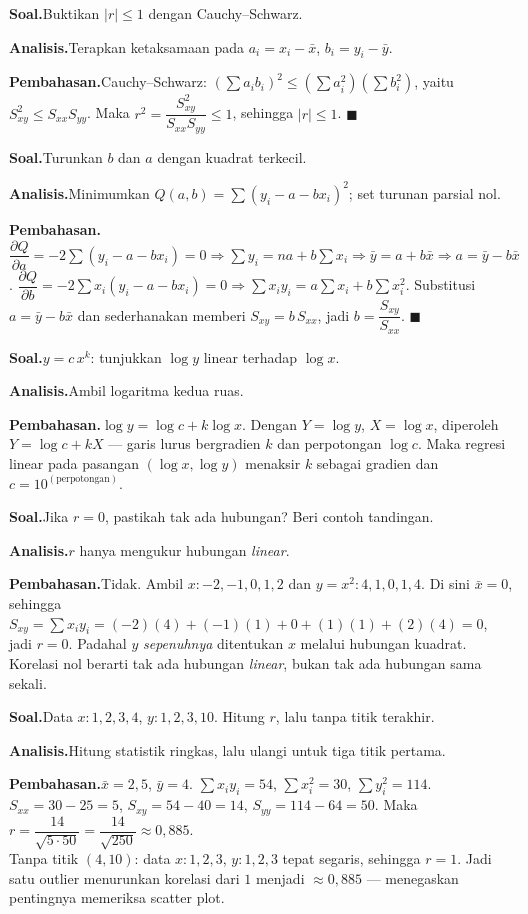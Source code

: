 \documentclass[11pt,a4paper]{report}
\theoremstyle{gaya}
\newcommand{\knomor}[1]{\par\medskip\noindent{\bfseries\color{ungu}#1}\par\nopagebreak}
\newcommand{\ksoal}{\noindent\textbf{\color{biru}Soal.}\space}
\newcommand{\kanalisis}{\par\noindent\textbf{\color{oranye}Analisis.}\space}
\newcommand{\kbahas}{\par\noindent\textbf{\color{hijau}Pembahasan.}\space}
\newcommand{\kbagian}[1]{\par\medskip\noindent{\large\bfseries\color{biru}#1}\par\smallskip}
\begin{document}
\knomor{D.2}
\ksoal Buktikan $|r|\le1$ dengan Cauchy--Schwarz.
\kanalisis Terapkan ketaksamaan pada $a_i=x_i-\bar x$, $b_i=y_i-\bar y$.
\kbahas Cauchy--Schwarz: $\left(\sum a_ib_i\right)^2\le\left(\sum a_i^2\right)\left(\sum b_i^2\right)$, yaitu $S_{xy}^2\le S_{xx}S_{yy}$. Maka $r^2=\dfrac{S_{xy}^2}{S_{xx}S_{yy}}\le1$, sehingga $|r|\le1$. $\blacksquare$

\knomor{D.3}
\ksoal Turunkan $b$ dan $a$ dengan kuadrat terkecil.
\kanalisis Minimumkan $Q(a,b)=\sum(y_i-a-bx_i)^2$; set turunan parsial nol.
\kbahas $\dfrac{\partial Q}{\partial a}=-2\sum(y_i-a-bx_i)=0\Rightarrow \sum y_i=na+b\sum x_i\Rightarrow \bar y=a+b\bar x\Rightarrow a=\bar y-b\bar x$.
$\dfrac{\partial Q}{\partial b}=-2\sum x_i(y_i-a-bx_i)=0\Rightarrow \sum x_iy_i=a\sum x_i+b\sum x_i^2$. Substitusi $a=\bar y-b\bar x$ dan sederhanakan memberi $S_{xy}=b\,S_{xx}$, jadi $b=\dfrac{S_{xy}}{S_{xx}}$. $\blacksquare$

\knomor{D.4}
\ksoal $y=c\,x^k$: tunjukkan $\log y$ linear terhadap $\log x$.
\kanalisis Ambil logaritma kedua ruas.
\kbahas $\log y=\log c+k\log x$. Dengan $Y=\log y$, $X=\log x$, diperoleh $Y=\log c+kX$ --- garis lurus bergradien $k$ dan perpotongan $\log c$. Maka regresi linear pada pasangan $(\log x,\log y)$ menaksir $k$ sebagai gradien dan $c=10^{(\text{perpotongan})}$.

\knomor{D.5}
\ksoal Jika $r=0$, pastikah tak ada hubungan? Beri contoh tandingan.
\kanalisis $r$ hanya mengukur hubungan \emph{linear}.
\kbahas Tidak. Ambil $x:-2,-1,0,1,2$ dan $y=x^2:4,1,0,1,4$. Di sini $\bar x=0$, sehingga $S_{xy}=\sum x_iy_i=(-2)(4)+(-1)(1)+0+(1)(1)+(2)(4)=0$, jadi $r=0$. Padahal $y$ \emph{sepenuhnya} ditentukan $x$ melalui hubungan kuadrat. Korelasi nol berarti tak ada hubungan \emph{linear}, bukan tak ada hubungan sama sekali.

\kbagian{Challenge Corner}

\knomor{1}
\ksoal Data $x:1,2,3,4$, $y:1,2,3,10$. Hitung $r$, lalu tanpa titik terakhir.
\kanalisis Hitung statistik ringkas, lalu ulangi untuk tiga titik pertama.
\kbahas $\bar x=2{,}5$, $\bar y=4$. $\sum x_iy_i=54$, $\sum x_i^2=30$, $\sum y_i^2=114$. $S_{xx}=30-25=5$, $S_{xy}=54-40=14$, $S_{yy}=114-64=50$. Maka $r=\dfrac{14}{\sqrt{5\cdot50}}=\dfrac{14}{\sqrt{250}}\approx0{,}885$. \\
Tanpa titik $(4,10)$: data $x:1,2,3$, $y:1,2,3$ tepat segaris, sehingga $r=1$. Jadi satu outlier menurunkan korelasi dari $1$ menjadi $\approx0{,}885$ --- menegaskan pentingnya memeriksa scatter plot.
\end{document}
